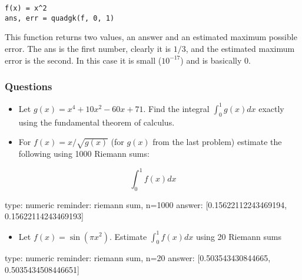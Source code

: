 \documentclass[12pt]{article}
\begin{document}
\begin{verbatim}
f(x) = x^2
ans, err = quadgk(f, 0, 1)
\end{verbatim}
This function returns two values, an answer and an estimated maximum
possible error. The ans is the first number, clearly it is $1/3$, and
the estimated maximum error is the second. In this case it is small
($10^{-17}$) and is basically 0.

\subsubsection{Questions}

\begin{itemize}
\itemsep1pt\parskip0pt
\item
  Let $g(x) = x^4 + 10x^2 - 60x + 71$. Find the integral
  $\int_0^1   g(x) dx$ exactly using the fundamental theorem of
  calculus.
\end{itemize}


\begin{itemize}
\itemsep1pt\parskip0pt
\item
  For $f(x) = x/\sqrt{g(x)}$ (for $g(x)$ from the last problem) estimate
  the following using 1000 Riemann sums:
\end{itemize}

\[
\int_0^1 f(x) dx
\]

\begin{answer}
    type: numeric
    reminder: riemann sum, n=1000
    answer: [0.15622112243469194, 0.15622114243469193]

\end{answer}

\begin{itemize}
\itemsep1pt\parskip0pt
\item
  Let $f(x) = \sin(\pi x^2)$. Estimate $\int_0^1 f(x) dx$ using 20
  Riemann sums
\end{itemize}

\begin{answer}
    type: numeric
    reminder: riemann sum, n=20
    answer: [0.503543430844665, 0.5035434508446651]

\end{answer}
\end{document}
